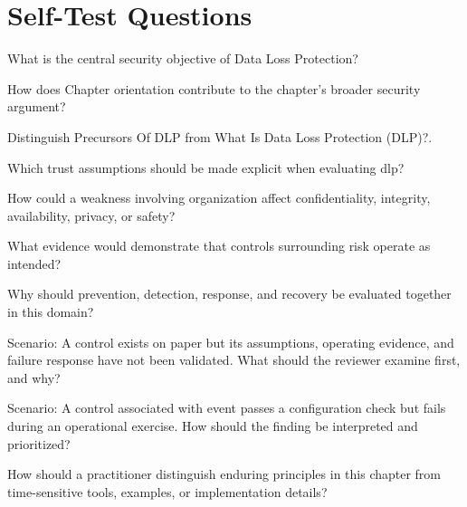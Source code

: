 \documentclass[11pt,letterpaper]{article}
\begin{document}
\section*{Self-Test Questions}
\begin{CornellRecallList}
\item What is the central security objective of Data Loss Protection?
\item How does Chapter orientation contribute to the chapter's broader security argument?
\item Distinguish Precursors Of DLP from What Is Data Loss Protection (DLP)?.
\item Which trust assumptions should be made explicit when evaluating dlp?
\item How could a weakness involving organization affect confidentiality, integrity, availability, privacy, or safety?
\item What evidence would demonstrate that controls surrounding risk operate as intended?
\item Why should prevention, detection, response, and recovery be evaluated together in this domain?
\item Scenario: A control exists on paper but its assumptions, operating evidence, and failure response have not been validated. What should the reviewer examine first, and why?
\item Scenario: A control associated with event passes a configuration check but fails during an operational exercise. How should the finding be interpreted and prioritized?
\item How should a practitioner distinguish enduring principles in this chapter from time-sensitive tools, examples, or implementation details?
\end{CornellRecallList}
\end{document}
